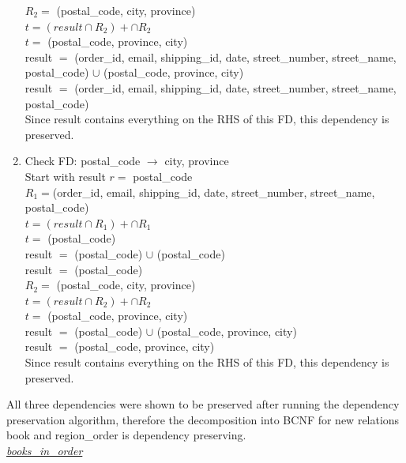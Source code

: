 \documentclass[a4 paper]{article}
\begin{document}
\begin{enumerate}
	$R_{2} =$ (postal\_code, city, province)\\
	$t = (result \cap R_{2})+ \cap R_{2}$\\
	$t =$ (postal\_code, province, city)\\
	result $=$ (order\_id, email, shipping\_id, date, street\_number, street\_name, postal\_code) $\cup$ (postal\_code, province, city)\\
	result $=$ (order\_id, email, shipping\_id, date, street\_number, street\_name, postal\_code)\\
	
	Since result contains everything on the RHS of this FD, this dependency is preserved.

	\item Check FD: postal\_code $\rightarrow$ city, province\\
	Start with result $r =$ postal\_code\\
	
	$R_{1} = $(order\_id, email, shipping\_id, date, street\_number, street\_name, postal\_code)\\
	$t = (result \cap R_{1})+ \cap R_{1}$\\
	$t =$ (postal\_code)\\
	result $=$ (postal\_code) $\cup$ (postal\_code)\\
	result $=$ (postal\_code)\\
	
	$R_{2} =$ (postal\_code, city, province)\\
	$t = (result \cap R_{2})+ \cap R_{2}$\\
	$t =$ (postal\_code, province, city)\\
	result $=$ (postal\_code) $\cup$ (postal\_code, province, city)\\
	result $=$ (postal\_code, province, city)\\
	
	Since result contains everything on the RHS of this FD, this dependency is preserved.

\end{enumerate}

\noindent All three dependencies were shown to be preserved after running the dependency preservation algorithm, therefore the decomposition into BCNF for new relations book and region\_order is dependency preserving.\\

\noindent\underline{\emph{books\_in\_order}}\\
\end{document}
